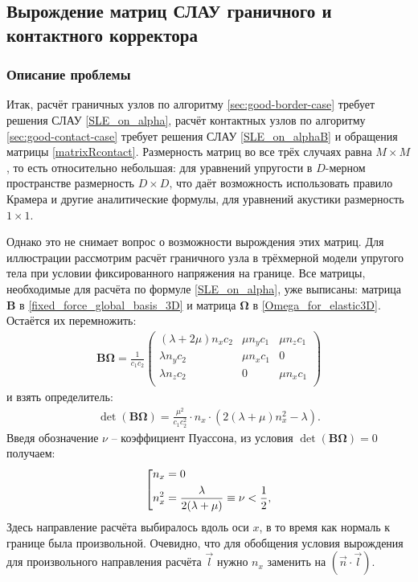 \subsection{Вырождение матриц СЛАУ граничного и контактного корректора}
\subsubsection{Описание проблемы}
\label{degeneration_problem}
Итак, расчёт граничных узлов по алгоритму \ref{sec:good-border-case} 
требует решения СЛАУ \ref{SLE_on_alpha}, 
расчёт контактных узлов по алгоритму \ref{sec:good-contact-case} требует 
решения СЛАУ \ref{SLE_on_alphaB} и обращения матрицы \ref{matrixRcontact}.
Размерность матриц во все трёх случаях равна $M \times M$, 
то есть относительно небольшая: для уравнений упругости в $D$-мерном 
пространстве размерность $D \times D$, что даёт возможность 
использовать правило Крамера и другие аналитические формулы, 
для уравнений акустики размерность $1 \times 1$. 

Однако это не снимает вопрос о возможности вырождения этих матриц. 
Для иллюстрации рассмотрим расчёт граничного узла в трёхмерной 
модели упругого тела при условии фиксированного напряжения на границе. 
Все матрицы, необходимые для расчёта по формуле \ref{SLE_on_alpha}, уже выписаны: 
матрица $\mathbf{B}$ в \ref{fixed_force_global_basis_3D} и 
матрица $\mathbf{\Omega}$ в \ref{Omega_for_elastic3D}. 
Остаётся их перемножить:
\begin{align}
	\mathbf{B} \mathbf{\Omega} = \frac{1}{c_1 c_2}
	\left( \begin{array}{cccccccccccc}
	 (\lambda + 2\mu) n_x c_2 & \mu n_y c_1 & \mu n_z c_1   \\
	 \lambda n_y c_2          & \mu n_x c_1 & 0             \\
	 \lambda n_z c_2          & 0 & \mu n_x c_1             \\
	\end{array} \right)
\end{align}
и взять определитель:
\begin{eqnarray}
	\det (\mathbf{B} \mathbf{\Omega}) = \frac{\mu^{2}}{c_1 c^2_2} \cdot n_x \cdot (2 (\lambda + \mu) n^2_x - \lambda).
\end{eqnarray}
Введя обозначение $\nu$ -- коэффициент Пуассона, из условия 
$\det (\mathbf{B} \mathbf{\Omega}) = 0$ получаем:
\begin{eqnarray}
\left[
\begin{gathered} 
	 n_x = 0  \hfill  \\
	 n^2_x = \frac{\lambda}{2(\lambda + \mu)} \equiv \nu < \frac{1}{2}, \hfill  \\
\end{gathered} 
\right.
\end{eqnarray}
Здесь направление расчёта выбиралось вдоль оси $x$, в то время как нормаль 
к границе была произвольной. Очевидно, что для обобщения условия 
вырождения для произвольного направления расчёта $\vec{l}$ нужно $n_x$ заменить на 
$(\vec{n} \cdot \vec{l})$.


